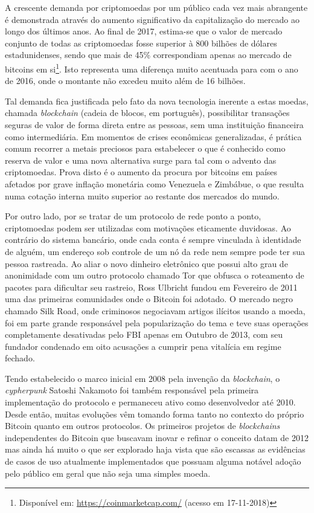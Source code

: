 \documentclass[a4paper,12pt]{monografia}
\theoremstyle{plain}
\theoremstyle{definition}
\theoremstyle{remark}
\begin{document}
A crescente demanda por criptomoedas por um p\'ublico cada vez mais abrangente \'e demonstrada atrav\'es do aumento significativo da capitaliza\c{c}\~ao do mercado ao longo dos \'ultimos anos.
Ao final de 2017, estima-se que o valor de mercado conjunto de todas as criptomoedas fosse superior \`a 800 bilh\~oes de d\'olares estadunidenses, sendo que mais de 45\% correspondiam apenas ao mercado de bitcoins em si\footnote{Dispon\'ivel em: \url{https://coinmarketcap.com/} (acesso em 17-11-2018)}.
Isto representa uma diferen\c{c}a muito acentuada para com o ano de 2016, onde o montante n\~{a}o excedeu muito al\'{e}m de 16 bilh\~{o}es.

Tal demanda fica justificada pelo fato da nova tecnologia inerente a estas moedas, chamada \textit{blockchain} (cadeia de blocos, em portugu\^{e}s), possibilitar transa\c{c}\~{o}es seguras de valor de forma direta entre as pessoas, sem uma institui\c{c}\~{a}o financeira como intermedi\'{a}ria.
Em momentos de crises econ\^{o}micas generalizadas, \'{e} pr\'{a}tica comum recorrer a metais preciosos para estabelecer o que \'{e} conhecido como reserva de valor e uma nova alternativa surge para tal com o advento das criptomoedas.
Prova disto \'{e} o aumento da procura por bitcoins em pa\'{i}ses afetados por grave infla\c{c}\~{a}o monet\'{a}ria como Venezuela e Zimbábue, o que resulta numa cota\c{c}\~{a}o interna muito superior ao restante dos mercados do mundo.

Por outro lado, por se tratar de um protocolo de rede ponto a ponto, criptomoedas podem ser utilizadas com motiva\c{c}\~{o}es eticamente duvidosas.
Ao contr\'{a}rio do sistema banc\'{a}rio, onde cada conta \'{e} sempre vinculada \`{a} identidade de algu\'{e}m, um endere\c{c}o sob controle de um n\'{o} da rede nem sempre pode ter sua pessoa rastreada.
Ao aliar o novo dinheiro eletr\^{o}nico que possui alto grau de anonimidade com um outro protocolo chamado Tor que obfusca o roteamento de pacotes para dificultar seu rastreio, Ross Ulbricht fundou em Fevereiro de 2011 uma das primeiras comunidades onde o Bitcoin foi adotado. O mercado negro chamado Silk Road, onde criminosos negociavam artigos il\'{i}citos usando a moeda, foi em parte grande respons\'{a}vel pela populariza\c{c}\~{a}o do tema e teve suas opera\c{c}\~{o}es completamente desativadas pelo FBI apenas em Outubro de 2013, com seu fundador condenado em oito acusa\c{c}\~{o}es a cumprir pena vital\'{i}cia em regime fechado.

Tendo estabelecido o marco inicial em 2008 pela inven\c{c}\~{a}o da \textit{blockchain}, o \textit{cypherpunk} \cite{cypherpunk} Satoshi Nakamoto foi tamb\'{e}m respons\'{a}vel pela primeira implementa\c{c}\~{a}o do protocolo e permaneceu ativo como desenvolvedor at\'{e} 2010.
Desde ent\~{a}o, muitas evolu\c{c}\~{o}es v\^{e}m tomando forma tanto no contexto do pr\'{o}prio Bitcoin quanto em outros protocolos.
Os primeiros projetos de \textit{blockchains} independentes do Bitcoin que buscavam inovar e refinar o conceito datam de 2012 mas ainda h\'{a} muito o que ser explorado haja vista que s\~{a}o escassas as evid\^{e}ncias de casos de uso atualmente implementados que possuam alguma not\'{a}vel ado\c{c}\~{a}o pelo p\'{u}blico em geral que n\~{a}o seja uma simples moeda. 
\end{document}
